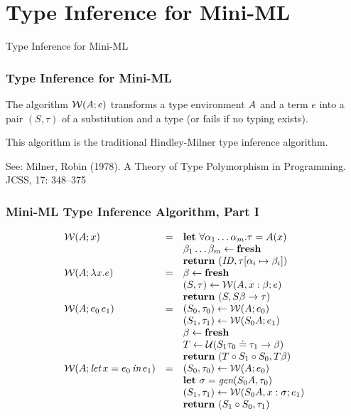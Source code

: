 \documentclass[pdftex,aspectratio=169]{beamer}
\begin{document}
\section{Type Inference for Mini-ML}
\begin{frame}
    \Huge
  \begin{center}
    {Type Inference for Mini-ML}
  \end{center}
\end{frame}

\begin{frame}
  \frametitle{Type Inference for Mini-ML}
  The algorithm $\mathcal{W} (A; e)$ transforms a type environment
  $A$ and a  term $e$ into a pair $(S, \tau)$ of a
  substitution and a type (or fails if no typing exists).

  This algorithm is the traditional Hindley-Milner type inference algorithm.

  See: Milner, Robin (1978). A Theory of Type Polymorphism in Programming. JCSS, 17: 348–375
\end{frame}

\begin{frame}
  \frametitle{Mini-ML Type Inference Algorithm, Part I}
  \begin{displaymath}
    \begin{array}{lcl}
      \mathcal{W} (A ; x) &=& \mathbf{let}\
      \forall\alpha_1\dots\alpha_m.\tau = A (x) \\
      && \beta_1\dots\beta_m \gets \mathbf{fresh} \\
      && \mathbf{return}\ (\mathit{ID}, \tau[\alpha_i\mapsto\beta_i])
      \\
      \mathcal{W} (A ; \lambda x.e) &=&
      \beta \gets \mathbf{fresh} \\
      &&  (S, \tau) \gets \mathcal{W} (A, x: \beta; e) \\
      && \mathbf{return}\ (S, S\beta \to \tau)
      \\
      \mathcal{W} (A; e_0\,{e_1}) &=&
      (S_0, \tau_0) \gets \mathcal{W} (A ; e_0) \\
      && (S_1, \tau_1) \gets \mathcal{W} (S_0A ; e_1)\\
      &&\beta \gets \mathbf{fresh}\\
      &&T \gets \mathcal{U} (S_1\tau_0 \doteq \tau_1\to \beta)\\
      &&\mathbf{return}\ (T \circ S_1 \circ S_0, T\beta)
      \\
      \mathcal{W} (A; \textit{let}\,x=e_0\,\textit{in}\,{e_1}) &=&
      (S_0, \tau_0) \gets \mathcal{W} (A ; e_0)\\
      && \mathbf{let}\ \sigma = \textit{gen} (S_0A, \tau_0) \\
      && (S_1, \tau_1) \gets \mathcal{W} (S_0A, x :\sigma; e_1) \\
      &&\mathbf{return}\ (S_1\circ S_0, \tau_1) \\
    \end{array}
  \end{displaymath}
\end{frame}
\end{document}
